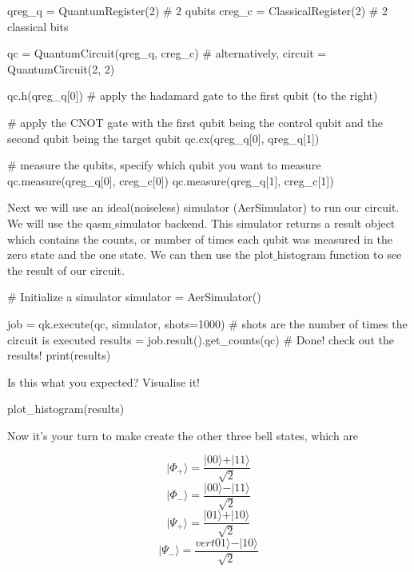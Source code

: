 \documentclass[%
oneside,                 %
final,                   %
10pt]{article}
\begin{document}
\bpycod
qreg_q = QuantumRegister(2) # 2 qubits
creg_c = ClassicalRegister(2) # 2 classical bits

qc = QuantumCircuit(qreg_q, creg_c) # alternatively, circuit = QuantumCircuit(2, 2)

qc.h(qreg_q[0]) # apply the hadamard gate to the first qubit (to the right)

# apply the CNOT gate with the first qubit being the control qubit and the second qubit being the target qubit
qc.cx(qreg_q[0], qreg_q[1]) 


# measure the qubits, specify which qubit you want to measure
qc.measure(qreg_q[0], creg_c[0])
qc.measure(qreg_q[1], creg_c[1])

\epycod


Next we will use an ideal(noiseless) simulator (AerSimulator) to run
our circuit. We will use the qasm$\_$simulator backend. This simulator
returns a result object which contains the counts, or number of times
each qubit was measured in the zero state and the one state. We can
then use the plot$\_$histogram function to see the result of our circuit.








\bpycod
# Initialize a simulator
simulator = AerSimulator()

job = qk.execute(qc, simulator, shots=1000) # shots are the number of times the circuit is executed
results = job.result().get_counts(qc) # Done! check out the results!
print(results)

\epycod

Is this what you expected? Visualise it!


\bpycod
plot_histogram(results)

\epycod


Now it's your turn to make create the other three bell states, which are

$$ \vert \Phi_+\rangle = \frac{\vert00\rangle + \vert11\rangle}{\sqrt{2}} $$
$$ \vert \Phi_-\rangle = \frac{\vert00\rangle - \vert11\rangle}{\sqrt{2}} $$
$$ \vert \Psi_+\rangle = \frac{\vert01\rangle + \vert10\rangle}{\sqrt{2}} $$
$$ \vert \Psi_-\rangle = \frac{vert01\rangle - \vert10\rangle}{\sqrt{2}} $$
\end{document}

